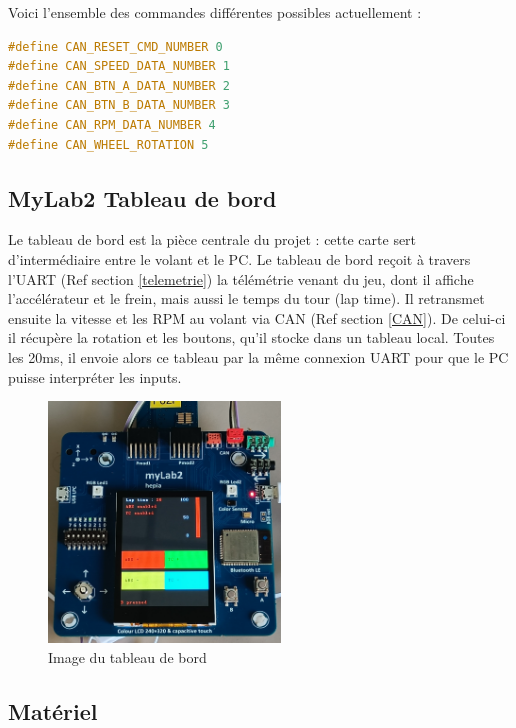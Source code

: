 \documentclass[french, 11pt]{article}
\begin{document}
\newpage
		Voici l'ensemble des commandes différentes possibles actuellement : 

\begin{lstlisting}[language=c, caption=Liste des commandes CAN disponibles]
#define CAN_RESET_CMD_NUMBER 0
#define CAN_SPEED_DATA_NUMBER 1
#define CAN_BTN_A_DATA_NUMBER 2
#define CAN_BTN_B_DATA_NUMBER 3
#define CAN_RPM_DATA_NUMBER 4
#define CAN_WHEEL_ROTATION 5
\end{lstlisting}

        
        \subsection{MyLab2 Tableau de bord}

        Le tableau de bord est la pièce centrale du projet : cette carte sert d'intermédiaire entre le volant et le PC. Le tableau de bord reçoit à travers l'UART (Ref section \ref{telemetrie}) la télémétrie venant du jeu, dont il affiche l'accélérateur et le frein, mais aussi le temps du tour (lap time). Il retransmet ensuite la vitesse et les RPM au volant via CAN (Ref section \ref{CAN}). De celui-ci il récupère la rotation et les boutons, qu'il stocke dans un tableau local. Toutes les 20ms, il envoie alors ce tableau par la même connexion UART pour que le PC puisse interpréter les inputs. 

		\begin{figure}[H]
			\centering
			\includegraphics[width=0.55\textwidth]{Images/mylab_dashboard.jpg}
			\caption{Image du tableau de bord}
		\end{figure}

        \subsection{Matériel}    
\end{document}
